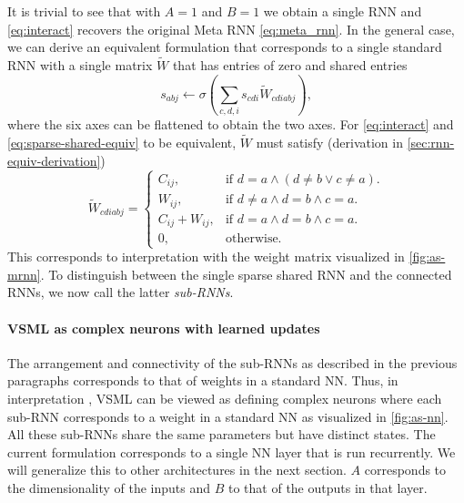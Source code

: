 \documentclass{article}
\newcommand{\principle}{VSML}
\newcommand*\circled[1]{\tikz[baseline=(char.base)]{
            \node[shape=circle,draw,inner sep=0.5pt] (char) {#1};}}
\newcommand{\intRNN}{\circled{A}}
\newcommand{\intNN}{\circled{C}}
\begin{document}
It is trivial to see that with $A = 1$ and $B = 1$ we obtain a single RNN and \autoref{eq:interact} recovers the original Meta RNN \autoref{eq:meta_rnn}.
In the general case, we can derive an equivalent formulation that corresponds to a single standard RNN with a single matrix $\tilde W$ that has entries of zero and shared entries
\begin{equation}\label{eq:sparse-shared-equiv}
    s_{abj} \leftarrow \sigma(\sum_{c,d,i} s_{cdi} \tilde W_{cdiabj}),
\end{equation}
where the six axes can be flattened to obtain the two axes.
For \autoref{eq:interact} and \autoref{eq:sparse-shared-equiv} to be equivalent, $\tilde W$ must satisfy (derivation in \autoref{sec:rnn-equiv-derivation})
\begin{equation}\label{eq:sparse-shared}
    \tilde W_{cdiabj} = \begin{cases}
        C_{ij}, & \text{if } d = a \land ( d \neq b \lor c \neq a ). \\
        W_{ij}, & \text{if } d \neq a \land d = b \land c = a. \\
        C_{ij} + W_{ij}, & \text{if } d = a \land d = b \land c = a. \\
        0, & \text{otherwise.}
    \end{cases}
\end{equation}
This corresponds to interpretation {\intRNN} with the weight matrix visualized in \autoref{fig:as-mrnn}.
To distinguish between the single sparse shared RNN and the connected RNNs, we now call the latter \emph{sub-RNNs}.

\paragraph{VSML as complex neurons with learned updates}

The arrangement and connectivity of the sub-RNNs as described in the previous paragraphs corresponds to that of weights in a standard NN.
Thus, in interpretation {\intNN}, {\principle} can be viewed as defining complex neurons where each sub-RNN corresponds to a weight in a standard NN as visualized in \autoref{fig:as-nn}.
All these sub-RNNs share the same parameters but have distinct states.
The current formulation corresponds to a single NN layer that is run recurrently.
We will generalize this to other architectures in the next section.
$A$ corresponds to the dimensionality of the inputs and $B$ to that of the outputs in that layer.
\end{document}
